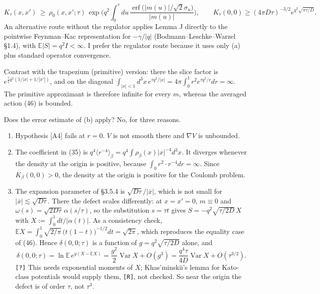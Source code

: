 \documentclass[11pt,a4paper]{article}
\providecommand{\tightlist}{\setlength{\itemsep}{0pt}\setlength{\parskip}{0pt}}
\begin{document}
\begin{enumerate}
  \[K_\tau(x,x')\ \ge\ \rho_0(x,x';\tau)\,\exp\Big(q^2\int_0^\tau du\,\frac{\operatorname{erf}\big(|m(u)|/\sqrt2\sigma_u\big)}{|m(u)|}\Big),\qquad K_\tau(0,0)\ge(4\pi D\tau)^{-3/2}e^{q^2\sqrt{\pi\tau/D}}.\tag{47}\]
  An alternative route without the regulator applies Lemma J directly to the pointwise Feynman--Kac representation for \(-\gamma/|q|\) (Bodmann--Leschke--Warzel §1.4), with \(\mathbb E|S|=q^2I<\infty\). I prefer the regulator route because it uses only (a) plus standard operator convergence.
\end{enumerate}

Contrast with the trapezium (primitive) version: there the slice factor is \(e^{\frac\tau2q^2(1/|x|+1/|x'|)}\), and on the diagonal \(\int_{|x|<1}d^3x\,e^{\tau q^2/|x|}=4\pi\int_0^1r^2e^{\tau q^2/r}dr=\infty\). The primitive approximant is therefore infinite for every \(m\), whereas the averaged action (46) is bounded.

Does the error estimate of (b) apply? No, for three reasons.

\begin{enumerate}
\def\labelenumi{\arabic{enumi}.}
\tightlist
\item
  Hypothesis {[}A4{]} fails at \(r=0\). \(V\) is not smooth there and \(\nabla V\) is unbounded.
\item
  The coefficient in (35) is \(q^4\langle r^{-4}\rangle_\beta=q^4\int\rho_\beta(x)|x|^{-4}d^3x\). It diverges whenever the density at the origin is positive, because \(\int_0r^2\cdot r^{-4}dr=\infty\). Since \(K_\beta(0,0)>0\), the density at the origin is positive for the Coulomb problem.
\item
  The expansion parameter of §3.5.4 is \(\sqrt{D\tau}/|\bar x|\), which is not small for \(|\bar x|\lesssim\sqrt{D\tau}\). There the defect scales differently: at \(x=x'=0\), \(m\equiv0\) and \(\omega(s)=\sqrt{2D\tau}\,\alpha(s/\tau)\), so the substitution \(s=\tau t\) gives \(S=-q^2\sqrt{\tau/2D}\,X\) with \(X:=\int_0^1dt/|\alpha(t)|\). As a consistency check, \(\mathbb EX=\int_0^1\sqrt{2/\pi}\,\big(t(1-t)\big)^{-1/2}dt=\sqrt{2\pi}\), which reproduces the equality case of (46). Hence \(\delta(0,0;\tau)\) is a function of \(g=q^2\sqrt{\tau/2D}\) alone, and
  \[\delta(0,0;\tau)=\ln\mathbb E\,e^{g(X-\mathbb EX)}=\frac{g^2}2\operatorname{Var}X+O(g^3)=\frac{q^4\tau}{4D}\operatorname{Var}X+O(\tau^{3/2}).\tag{48}\]
  \texttt{[?]} This needs exponential moments of \(X\); Khas'minskii's lemma for Kato-class potentials would supply them, \texttt{[R]}, not checked. So near the origin the defect is of order \(\tau\), not \(\tau^3\).
\end{enumerate}
\end{document}
